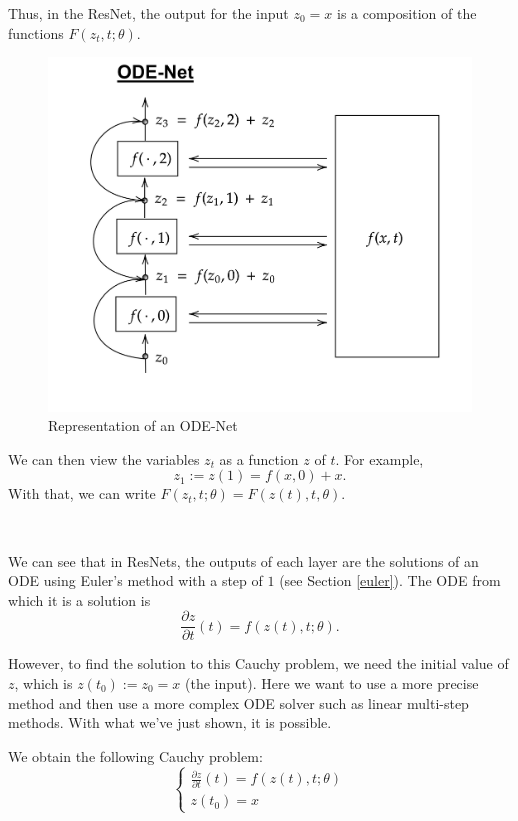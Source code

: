 \documentclass[10pt,a4paper]{article}
\theoremstyle{definition}
\theoremstyle{plain}
\begin{document}
Thus, in the ResNet, the output for the input $z_0 = x$ is a composition of the functions $F(z_t, t; \theta)$.


\begin{figure}
\center
\includegraphics[scale=0.18]{ODENet.png}
\caption{Representation of an ODE-Net}
\end{figure}

We can then view the variables $z_t$ as a function $z$ of $t$. For example,
\begin{equation*}
z_1 := z(1) = f(x, 0) + x.
\end{equation*}
With that, we can write $F(z_t, t; \theta) = F(z(t), t, \theta)$. 

~

We can see that in ResNets, the outputs of each layer are the solutions of an ODE using Euler's method with a step of $1$ (see Section \ref{euler}). The ODE from which it is a solution is 
$$\frac{\partial z}{\partial t}(t) = f(z(t),t;\theta).$$

However, to find the solution to this Cauchy problem, we need the initial value of $z$, which is $z(t_0) := z_0 = x$ (the input). Here we want to use a more precise method and then use a more complex ODE solver such as linear multi-step methods. With what we've just shown, it is possible.

We obtain the following Cauchy problem:
\begin{equation}
\label{cauchypb}
\begin{cases}
\frac{\partial z}{\partial t}(t) =  f(z(t), t; \theta) \\
z(t_0) =  x
\end{cases}
\end{equation}
\end{document}
